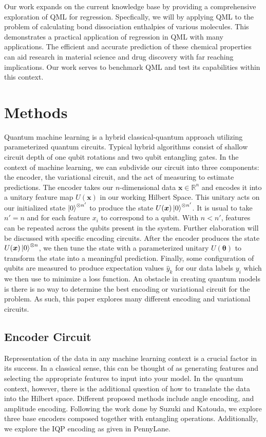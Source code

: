 \documentclass[journal=jacsat,manuscript=article]{achemso}
\newcommand{\R}{\mathbb{R}}
\begin{document}
Our work expands on the current knowledge base by providing a comprehensive exploration of QML for regression. Specfically, we will by applying QML to the problem of calculating bond dissociation enthalpies of various molecules. This demonstrates 
a practical application of regression in QML with many applications. The efficient and accurate prediction of these chemical properties can aid research in material science and drug discovery with far reaching implications. Our work serves to benchmark QML and test its capabilities within this context. \par

\section{Methods}
Quantum machine learning is a hybrid classical-quantum approach utilizing parameterized quantum circuits. Typical hybrid algorithms consist of shallow circuit depth of one qubit rotations and two qubit entangling gates. In the context of machine learning, we can subdivide our circuit into three components: the encoder, the variational circuit, and the act of measuring to estimate predictions. The encoder takes our $n$-dimensional data $\bm x \in \R^n$ and encodes it into a unitary feature map $U(\bm x)$ in our working Hilbert Space. This unitary acts on our initialized state $\ket{0}^{\otimes n'}$ to produce the state $U(\bm x) \ket{0}^{\otimes n'}$. It is usual to take $n' = n$ and for each feature $x_i$ to correspond to a qubit. With $n < n'$, features can be repeated across the qubits present in the system. Further elaboration will be discussed with specific encoding circuits. After the encoder produces the state $U(\bm x)\ket{0}^{\otimes n}$, we then tune the state with a parameterized unitary $U(\bm \theta)$ to transform the state into a meaningful prediction. Finally, some configuration of qubits are measured to produce expectation values $\hat y_k$ for our data labels $y_i$ which we then use to minimize a loss function. An obstacle in creating quantum models is there is no way to determine the best encoding or variational circuit for the problem. As such, this paper explores many different encoding and variational circuits. \par

\subsection{Encoder Circuit}
Representation of the data in any machine learning context is a crucial factor in its success. In a classical sense, this can be thought of as generating features and selecting the appropriate features to input into your model. In the quantum context, however, there is the additional question of how to translate the data into the Hilbert space. Different proposed  methods include angle encoding, and amplitude encoding. Following the work done by Suzuki and Katouda, we explore three base encoders composed together with entangling operations. Additionally, we explore the  IQP encoding as given in PennyLane. \par
\end{document}
